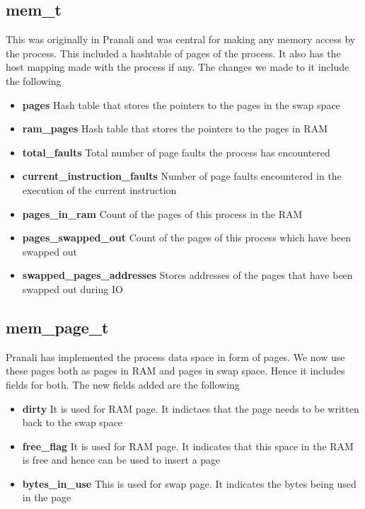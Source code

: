 \documentclass[paper=a4, fontsize=11pt,twoside]{scrartcl}   %
\begin{document}
\subsection{mem\_t}

This was originally in Pranali and was central for making any memory access by the process. This included a hashtable of pages of the process. It also has the host mapping made with the process if any. The changes we made to it include the following
\begin{itemize}
\item \textbf{pages}
Hash table that stores the pointers to the pages in the swap space 
\item \textbf{ram\_pages}
Hash table that stores the pointers to the pages in RAM
\item \textbf{total\_faults}
Total number of page faults the process has encountered 
\item\textbf{current\_instruction\_faults}
Number of page faults encountered in the execution of the current instruction
\item\textbf{pages\_in\_ram}
Count of the pages of this process in the RAM 
\item\textbf{pages\_swapped\_out}
Count of the pages of this process which have been swapped out
\item\textbf{swapped\_pages\_addresses} Stores addresses of the pages that have been swapped out during IO


\end{itemize}

\subsection{mem\_page\_t}
Pranali has implemented the process data space in form of pages. We now use these pages both as pages in RAM and pages in swap space. Hence it includes fields for both. The new fields added are the following
\begin{itemize}
\item \textbf{dirty}
It is used for RAM page. It indictaes that the page needs to be written back to the swap space 
\item \textbf{free\_flag}
It is used for RAM page. It indicates that this space in the RAM is free and hence can be used to insert a page
\item \textbf{bytes\_in\_use}
This is used for swap page. It indicates the bytes being used in the page


\end{itemize}
\end{document}
